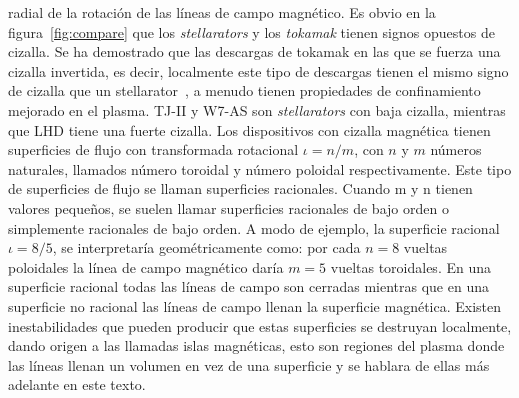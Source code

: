 radial de la rotación de las líneas de campo magnético. Es obvio en la figura~\ref{fig:compare} que los \textit{stellarators} y los \textit{tokamak} tienen signos opuestos de cizalla. Se
ha demostrado que las descargas de tokamak en las que se fuerza una cizalla
invertida, es decir, localmente este tipo de descargas tienen el mismo signo
de cizalla que un stellarator~\cite{PhysRevLett.75.4417}, a menudo tienen propiedades
de confinamiento mejorado en el plasma. TJ-II y W7-AS son \textit{stellarators}
con baja cizalla, mientras que LHD tiene una fuerte cizalla. Los
dispositivos con cizalla magnética tienen superficies de flujo con transformada
rotacional $\iota=n/m$, con $n$ y $m$ números naturales, llamados número toroidal
y número poloidal respectivamente. Este tipo de superficies de flujo se llaman
superficies racionales. Cuando m y n tienen valores pequeños, se
suelen llamar superficies racionales de bajo orden o simplemente racionales
de bajo orden. A modo de ejemplo, la superficie racional $\iota=8/5$,
se interpretaría geométricamente como: por cada $n=8$ vueltas poloidales la
línea de campo magnético daría $m=5$ vueltas toroidales. En una superficie
racional todas las líneas de campo son cerradas mientras que en una superficie
no racional las líneas de campo llenan la superficie magnética.
Existen inestabilidades que pueden producir que estas superficies
se destruyan localmente, dando origen a las llamadas islas magnéticas, esto son regiones del plasma donde las líneas llenan un volumen en vez de una
superficie y se hablara de ellas más adelante en este texto.
